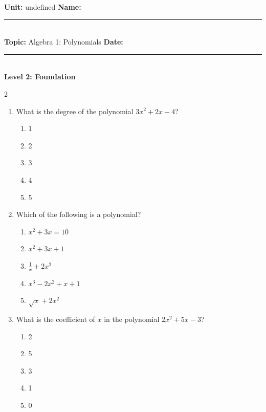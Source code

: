 \documentclass[10pt]{article}
\begin{document}
\enlargethispage{2.5cm}

\begin{tcolorbox}[colback=mainblue!5, colframe=mainblue, sharp corners, boxrule=0.5pt]
    \small \textbf{Unit:} undefined \hfill \textbf{Name:} \rule{3cm}{0.4pt} \\
    \small \textbf{Topic:} Algebra 1: Polynomials \hfill \textbf{Date:} \rule{2cm}{0.4pt} \\
    \centering \textbf{\large Level 2: Foundation}
\end{tcolorbox}

\vspace{0.2cm}

\begin{multicols}{2}
\begin{enumerate}[label=\textbf{Q\arabic*.}, leftmargin=*, itemsep=6pt, parsep=0pt]

  \item \small What is the degree of the polynomial $3x^2 + 2x - 4$?
  \begin{enumerate}[label=(\Alph*), leftmargin=0.6cm, nosep, itemsep=2pt]
    \item 1
    \item 2
    \item 3
    \item 4
    \item 5
  \end{enumerate}

  \item \small Which of the following is a polynomial? 
  \begin{enumerate}[label=(\Alph*), leftmargin=0.6cm, nosep, itemsep=2pt]
    \item $x^2 + 3x = 10$
    \item $x^2 + 3x + 1$
    \item $\frac{1}{x} + 2x^2$
    \item $x^3 - 2x^2 + x + 1$
    \item $\sqrt{x} + 2x^2$
  \end{enumerate}

  \item \small What is the coefficient of $x$ in the polynomial $2x^2 + 5x - 3$?
  \begin{enumerate}[label=(\Alph*), leftmargin=0.6cm, nosep, itemsep=2pt]
    \item 2
    \item 5
    \item 3
    \item 1
    \item 0
  \end{enumerate}


\end{enumerate}
\end{multicols}
\end{document}
